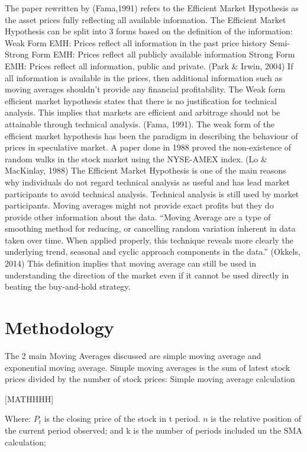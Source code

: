 \documentclass[12pt,preprint, authoryear]{elsarticle}
\numberwithin{equation}{section}
\numberwithin{figure}{section}
\numberwithin{table}{section}
\begin{document}
The paper rewritten by (Fama,1991) refers to the Efficient Market
Hypothesis as the asset prices fully reflecting all available
information. The Efficient Market Hypothesis can be split into 3 forms
based on the definition of the information: Weak Form EMH: Prices
reflect all information in the past price history Semi-Strong Form EMH:
Prices reflect all publicly available information Strong Form EMH:
Prices reflect all information, public and private. (Park \& Irwin,
2004) If all information is available in the prices, then additional
information such as moving averages shouldn't provide any financial
profitability. The Weak form efficient market hypothesis states that
there is no justification for technical analysis. This implies that
markets are efficient and arbitrage should not be attainable through
technical analysis. (Fama, 1991). The weak form of the efficient market
hypothesis has been the paradigm in describing the behaviour of prices
in speculative market. A paper done in 1988 proved the non-existence of
random walks in the stock market using the NYSE-AMEX index. (Lo \&
MacKinlay, 1988) The Efficient Market Hypothesis is one of the main
reasons why individuals do not regard technical analysis as useful and
has lead market participants to avoid technical analysis. Technical
analysis is still used by market participants. Moving averages might not
provide exact profits but they do provide other information about the
data. ``Moving Average are a type of smoothing method for reducing, or
cancelling random variation inherent in data taken over time. When
applied properly, this technique reveals more clearly the underlying
trend, seasonal and cyclic approach components in the data.'' (Okkels,
2014) This definition implies that moving average can still be used in
understanding the direction of the market even if it cannot be used
directly in beating the buy-and-hold strategy.

\section{Methodology}\label{methodology}

The 2 main Moving Averages discussed are simple moving average and
exponential moving average. Simple moving averages is the sum of latest
stock prices divided by the number of stock prices: Simple moving
average calculation

{[}MATHHHH{]}

Where: \(P_t\) is the closing price of the stock in t period. \(n\) is
the relative position of the current period observed; and k is the
number of periods included un the SMA calculation;
\end{document}
